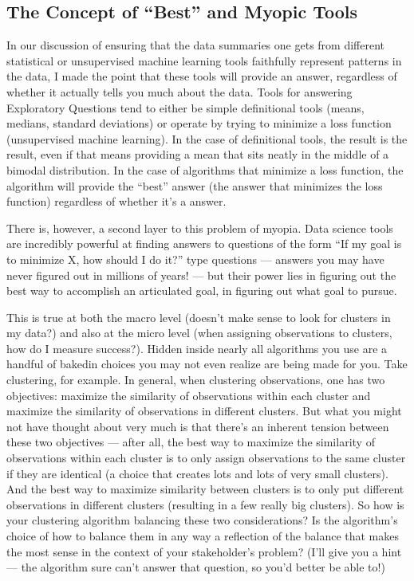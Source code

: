 \documentclass[letterpaper,10pt,english]{jupyterBook}
\begin{document}
\subsection{The Concept of “Best” and Myopic Tools}
\label{\detokenize{30_questions/19_exploratory_internal_meaningful:the-concept-of-best-and-myopic-tools}}
\sphinxAtStartPar
In our discussion of ensuring that the data summaries one gets from different statistical or unsupervised machine learning tools faithfully represent patterns in the data, I made the point that these tools will  provide an answer, regardless of whether it actually tells you much about the data. Tools for answering Exploratory Questions tend to either be simple definitional tools (means, medians, standard deviations) or operate by trying to minimize a loss function (unsupervised machine learning). In the case of definitional tools, the result is the result, even if that means providing a mean that sits neatly in the middle of a bimodal distribution. In the case of algorithms that minimize a loss function, the algorithm will provide the “best” answer (the answer that minimizes the loss function) regardless of whether it’s a  answer.

\sphinxAtStartPar
There is, however, a second layer to this problem of myopia. Data science tools are incredibly powerful at finding answers to questions of the form “If my goal is to minimize X, how should I do it?” type questions — answers you may have never figured out in millions of years! — but their power lies in figuring out the best way to accomplish an articulated goal,  in figuring out what goal to pursue.

\sphinxAtStartPar
This is true at both the macro level (doesn’t make sense to look for clusters in my data?) and also at the micro level (when assigning observations to clusters, how do I measure success?). Hidden inside nearly all algorithms you use are a handful of baked\sphinxhyphen{}in choices you may not even realize are being made for you. Take clustering, for example. In general, when clustering observations, one has two objectives: maximize the similarity of observations within each cluster and maximize the similarity of observations in different clusters. But what you might not have thought about very much is that there’s an inherent tension between these two objectives — after all, the best way to maximize the similarity of observations within each cluster is to only assign observations to the same cluster if they are identical (a choice that creates lots and lots of very small clusters). And the best way to maximize similarity between clusters is to only put  different observations in different clusters (resulting in a few really big clusters). So how is your clustering algorithm balancing these two considerations? Is the algorithm’s choice of how to balance them in any way a reflection of the balance that makes the most sense in the context of your stakeholder’s problem? (I’ll give you a hint — the algorithm sure can’t answer that question, so you’d better be able to!)
\end{document}
